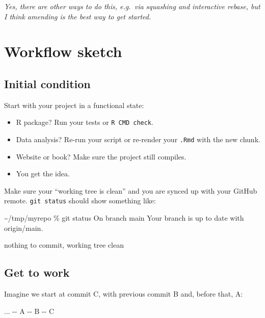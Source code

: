 \documentclass[
]{book}
\newenvironment{Shaded}{\begin{snugshade}}{\end{snugshade}}
\newcommand{\AttributeTok}[1]{\textcolor[rgb]{0.13,0.29,0.53}{#1}}
\newcommand{\ExtensionTok}[1]{#1}
\newcommand{\NormalTok}[1]{#1}
\providecommand{\tightlist}{%
  \setlength{\itemsep}{0pt}\setlength{\parskip}{0pt}}
\begin{document}
\emph{Yes, there are other ways to do this, e.g.~via squashing and interactive rebase, but I think amending is the best way to get started.}

\section{Workflow sketch}\label{workflow-sketch}

\subsection{Initial condition}\label{initial-condition}

Start with your project in a functional state:

\begin{itemize}
\tightlist
\item
  R package? Run your tests or \texttt{R\ CMD\ check}.
\item
  Data analysis? Re-run your script or re-render your \texttt{.Rmd} with the new chunk.
\item
  Website or book? Make sure the project still compiles.
\item
  You get the idea.
\end{itemize}

Make sure your ``working tree is clean'' and you are synced up with your GitHub remote. \texttt{git\ status} should show something like:

\begin{Shaded}
\begin{Highlighting}[]
\NormalTok{\textasciitilde{}/tmp/myrepo \% git status                                                          }
\NormalTok{On branch main}
\NormalTok{Your branch is up to date with \textquotesingle{}origin/main\textquotesingle{}.}

\NormalTok{nothing to commit, working tree clean}
\end{Highlighting}
\end{Shaded}

\subsection{Get to work}\label{get-to-work}

Imagine we start at commit C, with previous commit B and, before that, A:

\begin{Shaded}
\begin{Highlighting}[]
\ExtensionTok{...} \AttributeTok{{-}{-}}\NormalTok{ A }\AttributeTok{{-}{-}}\NormalTok{ B }\AttributeTok{{-}{-}}\NormalTok{ C}
\end{Highlighting}
\end{Shaded}
\end{document}
